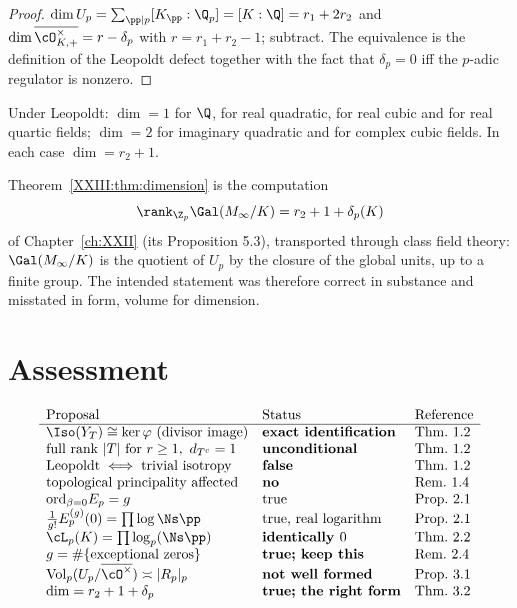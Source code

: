 \begin{proof}
$\dim U_p=\sum_{\pp\mid p}[K_\pp:\Q_p]=[K:\Q]=r_1+2r_2$ and
$\dim\overline{\cO^\times_{K,+}}=r-\delta_p$ with $r=r_1+r_2-1$; subtract. The equivalence is
the definition of the Leopoldt defect together with the fact that $\delta_p=0$ iff the
$p$-adic regulator is nonzero.
\end{proof}

\begin{example}\label{XXIII:ex:dim}
Under Leopoldt: $\dim=1$ for $\Q$, for real quadratic, for real cubic and for real quartic
fields; $\dim=2$ for imaginary quadratic and for complex cubic fields. In each case
$\dim=r_2+1$.
\end{example}

\begin{corollary}\label{XXIII:cor:agree}
Theorem~\ref{XXIII:thm:dimension} is the computation
\[
\rank_{\Z_p}\Gal(M_\infty/K)=r_2+1+\delta_p(K)
\]
of Chapter~\ref{ch:XXII} (its Proposition 5.3), transported through class field theory:
$\Gal(M_\infty/K)$ is the quotient of $U_p$ by the
closure of the global units, up to a finite group. The intended statement was therefore
correct in substance and misstated in form, volume for dimension.
\end{corollary}

\section{Assessment}

\[
\begin{array}{lll}
\text{Proposal} & \text{Status} & \text{Reference}\\\hline
\Iso(Y_T)\cong\ker\varphi\ \text{(divisor image)} & \textbf{exact identification} & \text{Thm.~1.2}\\
\text{full rank }|T|\ \text{for }r\ge1,\ d_{T^c}=1 & \textbf{unconditional} & \text{Thm.~1.2}\\
\text{Leopoldt}\iff\text{trivial isotropy} & \textbf{false} & \text{Thm.~1.2}\\
\text{topological principality affected} & \textbf{no} & \text{Rem.~1.4}\\
\mathrm{ord}_{\beta=0}E_p=g & \text{true} & \text{Prop.~2.1}\\
\tfrac{1}{g!}E_p^{(g)}(0)=\prod\log\Ns\pp & \text{true, real logarithm} & \text{Prop.~2.1}\\
\cL_p(K)=\prod\log_p(\Ns\pp) & \textbf{identically }0 & \text{Thm.~2.2}\\
g=\#\{\text{exceptional zeros}\} & \textbf{true; keep this} & \text{Rem.~2.4}\\
\mathrm{Vol}_p(U_p/\overline{\cO^\times})\asymp|R_p|_p & \textbf{not well formed} & \text{Prop.~3.1}\\
\dim=r_2+1+\delta_p & \textbf{true; the right form} & \text{Thm.~3.2}
\end{array}
\]

